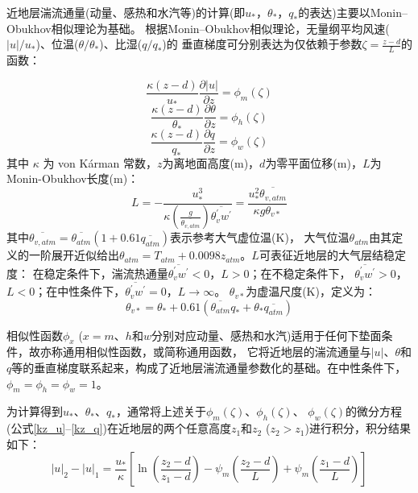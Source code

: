 近地层湍流通量(动量、感热和水汽等)的计算(即$u_\ast$，$\theta_\ast$，$q_\ast$的表达)主要以Monin--Obukhov相似理论为基础。
根据Monin--Obukhov相似理论，无量纲平均风速($\left|u\right|/u_\ast$)、位温($\theta/\theta_\ast$)、比湿($q/q_\ast$)的
垂直梯度可分别表达为仅依赖于参数$\zeta=\frac{z-d}{L}$的函数：

\begin{equation}\label{kz_u}
\frac{\kappa (z-d)}{u_{*}} \frac{\partial|u|}{\partial z}=\phi_{m}(\zeta)
\end{equation}
\begin{equation}\label{kz_theta}
\frac{\kappa (z-d)}{\theta_{*}} \frac{\partial \theta}{\partial z}=\phi_{h}(\zeta)
\end{equation}
\begin{equation}\label{kz_q}
\frac{\kappa (z-d)}{q_{*}} \frac{\partial q}{\partial z}=\phi_{w}(\zeta)
\end{equation}
其中 $\kappa$ 为 von K\'arman 常数，$z$为离地面高度(m)，$d$为零平面位移(m)，$L$为Monin-Obukhov长度(m)：
\begin{equation}\label{ObukL}
L=-\frac{u_{*}^{3}}{\kappa \left(\frac{g}{\overline{\theta_{v, atm}}}\right) \overline{\theta_{v}^{\prime} w^{\prime}}}=\frac{u_{*}^{2} \overline{\theta_{v, atm}}}{\kappa g \theta_{v *}}
\end{equation}
其中$\overline{\theta_{v,atm}}=\overline{\theta_{atm}}(1+0.61\overline{q_{atm}})$表示参考大气虚位温(K)，
 大气位温$\theta_{atm}$由其定义的一阶展开近似给出$\theta_{atm}=T_{atm}+0.0098z_{atm}$。$L$可表征近地层的大气层结稳定度：
 在稳定条件下，湍流热通量$\overline{\theta_v^\prime w^\prime}<0$，$L>0$；在不稳定条件下，
 $\overline{\theta_v^\prime w^\prime}>0$，$L<0$；在中性条件下，$\overline{\theta_v^\prime w^\prime}=0$，$L\rightarrow\infty$。
$\theta_{v\ast}$为虚温尺度(K)，定义为：
\begin{equation}\label{thvstar}
\theta_{v\ast}=\theta_\ast+0.61(\overline{\theta_{atm}}q_\ast + \theta_\ast\overline{q_{atm}})
\end{equation}

相似性函数$\phi_x$ ($x=m$、$h$和$w$分别对应动量、感热和水汽)适用于任何下垫面条件，故亦称通用相似性函数，或简称通用函数，
它将近地层的湍流通量与$\left|u\right|$、$\theta$和$q$等的垂直梯度联系起来，构成了近地层湍流通量参数化的基础。在中性条件下，$\phi_m=\phi_h=\phi_w=1$。



为计算得到$u_\ast$、$\theta_\ast$、$q_\ast$，通常将上述关于$\phi_m\left(\zeta\right)$、$\phi_h\left(\zeta\right)$、
$\phi_w(\zeta)$的微分方程(公式\eqref{kz_u}--\eqref{kz_q})在近地层的两个任意高度$z_1$和$z_2$ ($z_2>z_1$)进行积分，积分结果如下：
\begin{equation}
|u|_{2}-|u|_{1}=\frac{u_{*}}{\kappa}\left[\ln \left(\frac{z_{2}-d}{z_{1}-d}\right)-\psi_{m}\left(\frac{z_{2}-d}{L}\right)+\psi_{m}\left(\frac{z_{1}-d}{L}\right)\right]
\end{equation}


